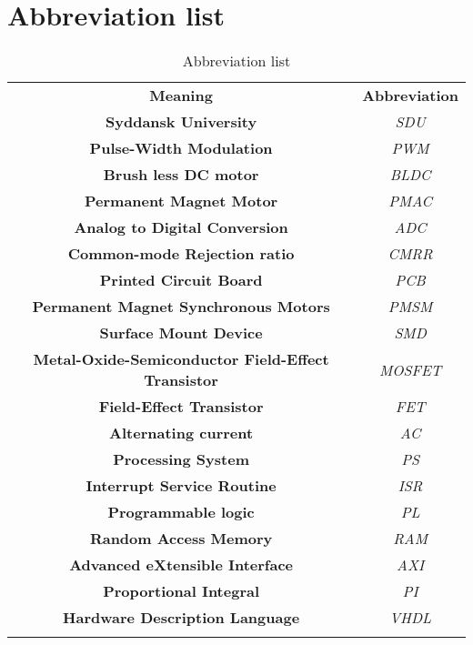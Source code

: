 \section{Abbreviation list}
\label{sec:abbreviation_list}
\begin{table}[]
\centering
\begin{tabular}{|c|c|} \cline{1-2}
\textbf{Meaning} & \textbf{Abbreviation} \\ \cline{1-2}
\textbf{Syddansk University} & \textit{SDU} \\ \cline{1-2}
\textbf{Pulse-Width Modulation} & \textit{PWM} \\ \cline{1-2}
\textbf{Brush less DC motor} & \textit{BLDC} \\ \cline{1-2}
\textbf{Permanent Magnet Motor} & \textit{PMAC} \\ \cline{1-2}
\textbf{Analog to Digital Conversion} & \textit{ADC} \\ \cline{1-2}
\textbf{Common-mode Rejection ratio} & \textit{CMRR} \\ \cline{1-2}
\textbf{Printed Circuit Board} & \textit{PCB} \\ \cline{1-2}
\textbf{Permanent Magnet Synchronous Motors} & \textit{PMSM} \\ \cline{1-2}
\textbf{Surface Mount Device} & \textit{SMD} \\ \cline{1-2}
\textbf{Metal-Oxide-Semiconductor Field-Effect Transistor} & \textit{MOSFET} \\ \cline{1-2}
\textbf{Field-Effect Transistor} & \textit{FET} \\ \cline{1-2}
\textbf{Alternating current} & \textit{AC} \\ \cline{1-2}
\textbf{Processing System} & \textit{PS} \\ \cline{1-2}
\textbf{Interrupt Service Routine} & \textit{ISR} \\ \cline{1-2}
\textbf{Programmable logic} & \textit{PL} \\ \cline{1-2}
\textbf{Random Access Memory} & \textit{RAM} \\ \cline{1-2}
\textbf{Advanced eXtensible Interface} & \textit{AXI} \\ \cline{1-2}
\textbf{Proportional Integral} & \textit{PI} \\ \cline{1-2}
\textbf{Hardware Description Language} & \textit{VHDL} \\ \cline{1-2}
\textbf{} & \textit{} \\ \cline{1-2}
\end{tabular} \\
\caption{Abbreviation list}\label{Abbreviationlist}
\label{tab:variable_ids}
\end{table}